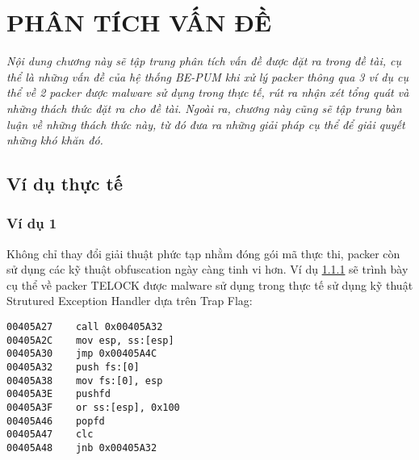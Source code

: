 
\newpage
\chapter{PHÂN TÍCH VẤN ĐỀ}

\begin{concept}[15cm]
\textit{Nội dung chương này sẽ tập trung phân tích vấn đề được đặt ra trong đề tài, cụ thể là những vấn đề của hệ thống BE-PUM khi xử lý packer thông qua 3 ví dụ cụ thể về 2 packer được malware sử dụng trong thực tế, rút ra nhận xét tổng quát và những thách thức đặt ra cho đề tài. Ngoài ra, chương này cũng sẽ tập trung bàn luận về những thách thức này, từ đó đưa ra những giải pháp cụ thể để giải quyết những khó khăn đó.}
\end{concept}

\section{Ví dụ thực tế}\label{sec:Example}

\subsection{Ví dụ 1}\label{subsec:Example1}

\hspace{0.5cm}Không chỉ thay đổi giải thuật phức tạp nhằm đóng gói mã thực thi, packer còn sử dụng các kỹ thuật obfuscation ngày càng tinh vi hơn. Ví dụ \ref {subsec:Example1} sẽ trình bày cụ thể về packer TELOCK được malware sử dụng trong thực tế sử dụng kỹ thuật Strutured Exception Handler dựa trên Trap Flag:

\begin{code}
\begin{lstlisting}[captionpos=b,caption={Kỹ thuật Structured Exception Handler sử dụng trong packer TELOCK},label={lst:ASMExample1},frame=single]
00405A27	call 0x00405A32
00405A2C	mov esp, ss:[esp]
00405A30	jmp 0x00405A4C
00405A32	push fs:[0]
00405A38	mov fs:[0], esp
00405A3E	pushfd
00405A3F	or ss:[esp], 0x100
00405A46	popfd
00405A47	clc
00405A48	jnb 0x00405A32
\end{lstlisting}
\end{code}

